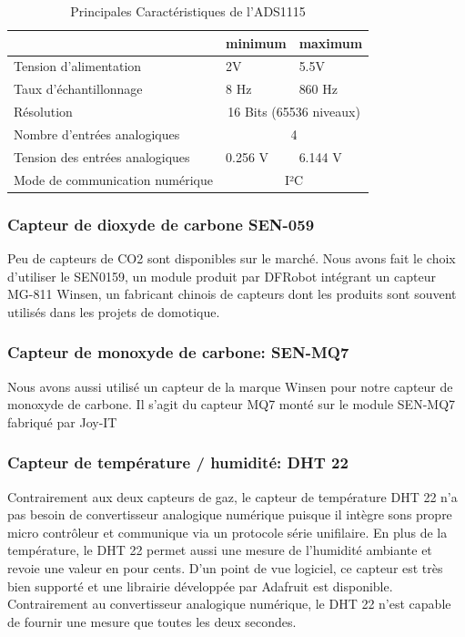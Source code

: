 \documentclass[a4paper]{report}
\begin{document}
\begin{table}[]
\centering
\begin{tabular}{|l|ll|}
\hline
                                & \multicolumn{1}{l|}{minimum}    & maximum    \\ \hline
Tension d'alimentation          & \multicolumn{1}{l|}{2V}         & 5.5V       \\ \hline
Taux d'échantillonnage          & \multicolumn{1}{l|}{8 Hz}       & 860 Hz     \\ \hline
Résolution                      & \multicolumn{2}{c|}{16 Bits (65536 niveaux)} \\ \hline
Nombre d'entrées analogiques    & \multicolumn{2}{c|}{4}                       \\ \hline
Tension des entrées analogiques & \multicolumn{1}{l|}{0.256 V}    & 6.144 V    \\ \hline
Mode de communication numérique & \multicolumn{2}{c|}{I²C}                     \\ \hline
\end{tabular}
\caption{Principales Caractéristiques de l'ADS1115}
\label{tab:ads1115}
\end{table}

\subsubsection{Capteur de dioxyde de carbone SEN-059}
	Peu de capteurs de CO2 sont disponibles sur le marché. Nous avons fait le choix d'utiliser le SEN0159, un module produit par DFRobot intégrant un capteur MG-811 Winsen, un fabricant chinois de capteurs dont les produits sont souvent utilisés dans les projets de domotique.
\subsubsection{Capteur de monoxyde de carbone: SEN-MQ7}
	Nous avons aussi utilisé un capteur de la marque Winsen pour notre capteur de monoxyde de carbone. Il s'agit du capteur MQ7 monté sur le module SEN-MQ7 fabriqué par Joy-IT
\subsubsection{Capteur de température / humidité: DHT 22}
	Contrairement aux deux capteurs de gaz, le capteur de température DHT 22 n'a pas besoin de convertisseur analogique numérique puisque il intègre sons propre micro contrôleur et communique via un protocole série unifilaire. En plus de la température, le DHT 22 permet aussi une mesure de l'humidité ambiante et revoie une valeur en pour cents. D'un point de vue logiciel, ce capteur est très bien supporté et une librairie développée par Adafruit est disponible. Contrairement au convertisseur analogique numérique, le DHT 22 n'est capable de fournir une mesure que toutes les deux secondes.
	
\end{document}
